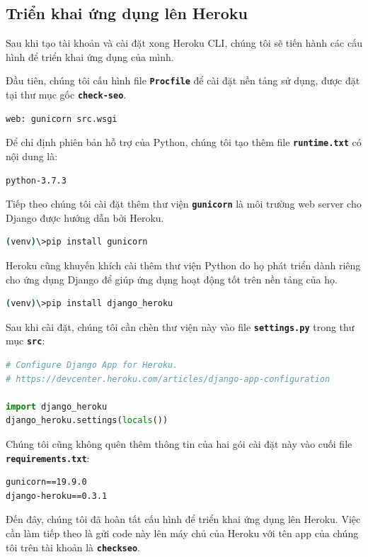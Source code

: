 \subsection{Triển khai ứng dụng lên Heroku}
Sau khi tạo tài khoản và cài đặt xong Heroku CLI, chúng tôi sẽ tiến hành các cấu hình để triển khai ứng dụng của mình.
\par
Đầu tiên, chúng tôi cấu hình file \textbf{\texttt{Procfile}} để cài đặt nền tảng sử dụng, được đặt tại thư mục gốc \textbf{\texttt{check-seo}}.
\begin{lstlisting}
web: gunicorn src.wsgi
\end{lstlisting}
\par
Để chỉ định phiên bản hỗ trợ của Python, chúng tôi tạo thêm file \textbf{\texttt{runtime.txt}} có nội dung là:
\begin{lstlisting}
python-3.7.3 
\end{lstlisting}
\par
Tiếp theo chúng tôi cài đặt thêm thư viện \textbf{\texttt{gunicorn}} là môi trường web server cho Django được hướng dẫn bởi Heroku.
\begin{lstlisting}[language=bash]
(venv)\>pip install gunicorn
\end{lstlisting}
\par
Heroku cũng khuyến khích cài thêm thư viện Python do họ phát triển dành riêng cho ứng dụng Django để giúp ứng dụng hoạt động tốt trên nền tảng của họ.
\begin{lstlisting}[language=bash]
(venv)\>pip install django_heroku
\end{lstlisting}
\par
Sau khi cài đặt, chúng tôi cần chèn thư viện này vào file \textbf{\texttt{settings.py}} trong thư mục \textbf{\texttt{src}}:
\begin{lstlisting}[language=Python]
# Configure Django App for Heroku.
# https://devcenter.heroku.com/articles/django-app-configuration
    
import django_heroku
django_heroku.settings(locals())
\end{lstlisting}
\par
Chúng tôi cũng không quên thêm thông tin của hai gói cài đặt này vào cuối file \textbf{\texttt{requirements.txt}}:
\begin{lstlisting}
gunicorn==19.9.0
django-heroku==0.3.1
\end{lstlisting}
\par
Đến đây, chúng tôi đã hoàn tất cấu hình để triển khai ứng dụng lên Heroku. Việc cần làm tiếp theo là gửi code này lên máy chủ của Heroku với tên app của chúng tôi trên tài khoản là \textbf{\texttt{checkseo}}.
